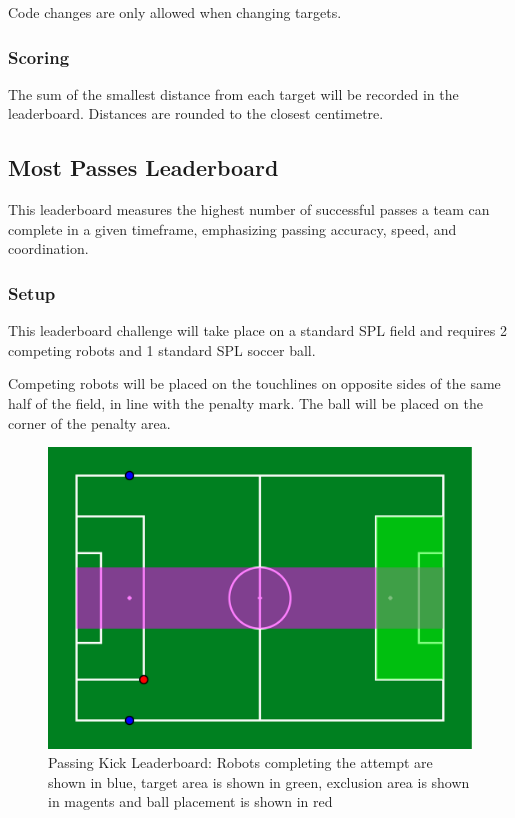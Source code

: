 Code changes are only allowed when changing targets.
\subsubsection{Scoring}
The sum of the smallest distance from each target will be recorded in the leaderboard.
Distances are rounded to the closest centimetre.

\subsection{Most Passes Leaderboard}
This leaderboard measures the highest number of successful passes a team can
complete in a given timeframe, emphasizing passing accuracy, speed, and coordination.

\subsubsection{Setup}
This leaderboard challenge will take place on a standard SPL field and requires 2 competing robots
and 1 standard SPL soccer ball.

Competing robots will be placed on the touchlines on opposite sides of the same half of the field,
in line with the penalty mark. The ball will be placed on the corner of the penalty area.

\begin{figure}[t]
    \centerline{\includegraphics[width=\columnwidth]{figs/passing_leaderboard.pdf}}
    \caption{Passing Kick Leaderboard: Robots completing the attempt are shown in blue, target area is shown in green, exclusion area is shown in magents and ball placement is shown in red}
    \label{fig:passing_leaderboard}
\end{figure}

